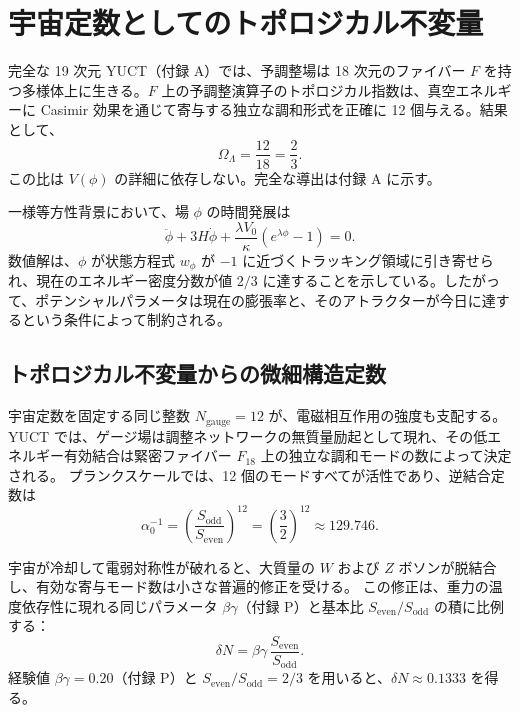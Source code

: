 \documentclass[12pt,a4paper]{article}
\begin{document}
	\section{宇宙定数としてのトポロジカル不変量}
	
	完全な 19 次元 YUCT（付録 A）では、予調整場は 18 次元のファイバー \(F\) を持つ多様体上に生きる。\(F\) 上の予調整演算子のトポロジカル指数は、真空エネルギーに Casimir 効果を通じて寄与する独立な調和形式を正確に 12 個与える。結果として、
	\begin{equation}
		\Omega_\Lambda = \frac{12}{18} = \frac{2}{3}.
		\label{eq:OmegaLambda}
	\end{equation}
	この比は \(V(\phi)\) の詳細に依存しない。完全な導出は付録 A に示す。
	
	一様等方性背景において、場 \(\phi\) の時間発展は
	\[
	\ddot\phi + 3H \dot\phi + \frac{\lambda V_0}{\kappa}(e^{\lambda\phi}-1) = 0.
	\]
	数値解は、\(\phi\) が状態方程式 \(w_\phi\) が \(-1\) に近づくトラッキング領域に引き寄せられ、現在のエネルギー密度分数が値 \(2/3\) に達することを示している。したがって、ポテンシャルパラメータは現在の膨張率と、そのアトラクターが今日に達するという条件によって制約される。
	
	\subsection{トポロジカル不変量からの微細構造定数}
	
	宇宙定数を固定する同じ整数 \(N_{\mathrm{gauge}} = 12\) が、電磁相互作用の強度も支配する。  
	YUCT では、ゲージ場は調整ネットワークの無質量励起として現れ、その低エネルギー有効結合は緊密ファイバー \(F_{18}\) 上の独立な調和モードの数によって決定される。  
	プランクスケールでは、12 個のモードすべてが活性であり、逆結合定数は
	\begin{equation}
		\alpha_0^{-1} = \left( \frac{S_{\mathrm{odd}}}{S_{\mathrm{even}}} \right)^{12}
		= \left( \frac{3}{2} \right)^{12} \approx 129.746 .
	\end{equation}
	
	宇宙が冷却して電弱対称性が破れると、大質量の \(W\) および \(Z\) ボソンが脱結合し、有効な寄与モード数は小さな普遍的修正を受ける。  
	この修正は、重力の温度依存性に現れる同じパラメータ \(\beta\gamma\)（付録 P）と基本比 \(S_{\mathrm{even}}/S_{\mathrm{odd}}\) の積に比例する：
	\begin{equation}
		\delta N = \beta\gamma \, \frac{S_{\mathrm{even}}}{S_{\mathrm{odd}}} .
		\label{eq:deltaN}
	\end{equation}
	経験値 \(\beta\gamma = 0.20\)（付録 P）と \(S_{\mathrm{even}}/S_{\mathrm{odd}} = 2/3\) を用いると、\(\delta N \approx 0.1333\) を得る。
	
\end{document}
